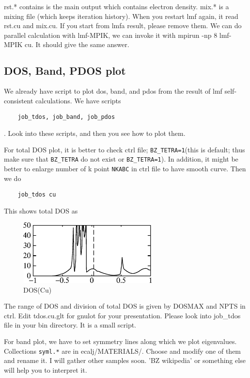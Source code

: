\documentclass[a4paper,10pt,epsf,fleqn]{article}
\newcommand{\io}[1]{{\sf  #1}\index{#1}}
\begin{document}
rst.* contains is the main output which contains electron density.
mix.* is a mixing file (which keeps iteration history).
When you restart lmf again, it read rst.cu and mix.cu.
If you start from lmfa result, please remove them.
We can do parallel calculation with lmf-MPIK, 
we can invoke it with mpirun -np 8 lmf-MPIK cu. It should give the
same answer.



\subsection{DOS, Band, PDOS plot}

We already have script to plot dos, band, and pdos
from the result of lmf self-consistent calculations.
We have scripts
\begin{verbatim}
    job_tdos, job_band, job_pdos
\end{verbatim}
. Look into these scripts, and then you see how to plot them.

For total DOS plot, it is better to check ctrl file;
\verb+BZ_TETRA=1+(this is default; thus make sure that \verb+BZ_TETRA+ do
not exist or \verb+BZ_TETRA=1+). 
In addition, it might be better to enlarge number of k point
\verb+NKABC+ in ctrl file to have smooth curve. Then we do
\begin{verbatim}
    job_tdos cu
\end{verbatim}
This shows total DOS as
\begin{figure}[h]
 \begin{center}
  \includegraphics[width=70mm]{img/doscu.eps}
  \vspace{5mm}
  \caption{DOS(Cu)}
 \end{center}
\end{figure}
The range of DOS and division of total DOS is given by
DOSMAX and NPTS in ctrl. Edit tdos.cu.glt for gnulot for your presentation. 
Please look into \io{job\_tdos} file in your bin directory. It is a small script.

For band plot, we have to set symmetry lines along which we plot eigenvalues.
Collections \verb+syml.*+ are in ecalj/MATERIALS/. 
Choose and modify one of them and rename it. 
I will gather other samples soon. 'BZ wikipedia' or something else
will help you to interpret it.
\end{document}
